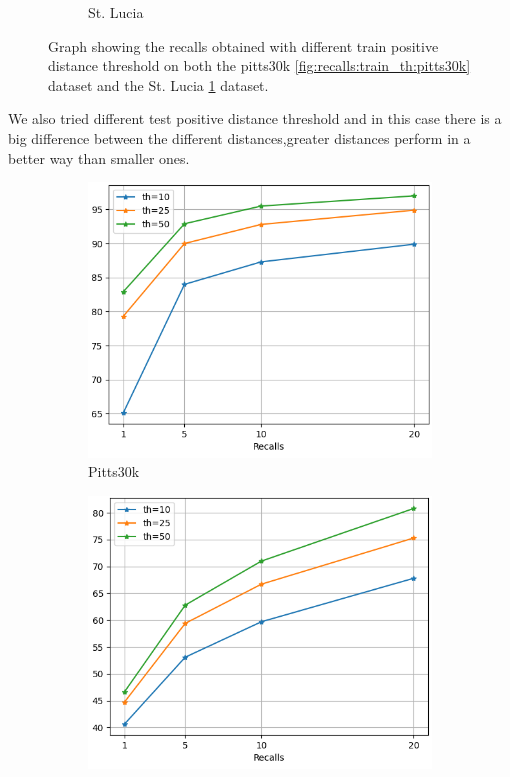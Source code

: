 \documentclass[10pt,twocolumn,letterpaper]{article}
\begin{document}
\begin{figure}
\begin{subfigure}[b]{0.23\textwidth}
		\caption{St. Lucia}
		\label{fig:recalls:train_th:st_lucia}
	\end{subfigure}
	\caption{Graph showing the recalls obtained with different train positive distance threshold on both the pitts30k \ref{fig:recalls:train_th:pitts30k} dataset and the St. Lucia \ref{fig:recalls:train_th:st_lucia} dataset.}
	\label{fig:recalls:train_th}
\end{figure}
We also tried different test positive distance threshold and in this case there is a big difference between the different distances,greater distances perform in a better way than smaller ones.\\
\begin{figure}
	\centering
	\begin{subfigure}[b]{0.23\textwidth}
		\centering
		\includegraphics[width=\textwidth]{img/test_th/test_pitts30k_recalls_graph.png}
		\caption{Pitts30k}
		\label{fig:recalls:test_th:pitts30k}
	\end{subfigure}
	\hfill
	\begin{subfigure}[b]{0.23\textwidth}
		\centering
		\includegraphics[width=\textwidth]{img/test_th/test_st_lucia_recalls_graph.png}

\end{subfigure}
\end{figure}
\end{document}
